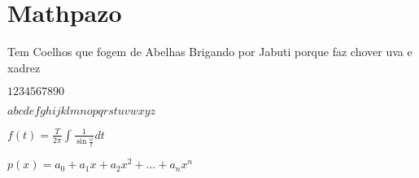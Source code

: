 \documentclass{article}
\newcommand{\frase}{Tem Coelhos que fogem de Abelhas Brigando por Jabuti porque faz chover uva e xadrez}
\newcommand{\pol}{
  p(x) = a_0 + a_1 x + a_2 x^2 + \ldots + a_n x^n
}
\begin{document}
\section*{Mathpazo}

\frase

$1234567890$

$abcdefghijklmnopqrstuvwxyz$

$f(t) = \frac{T}{2\pi} \int{\frac{1}{\sin\frac{\omega}{t}}}dt$

$\pol$
\end{document}

